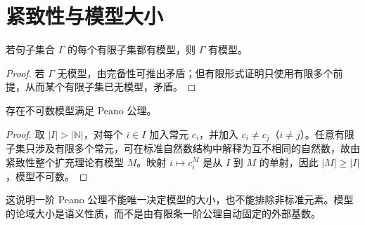 \section{紧致性与模型大小}\label{sec:ls}

\begin{theorem}[紧致性]
若句子集合 $\Gamma$ 的每个有限子集都有模型，则 $\Gamma$ 有模型。
\end{theorem}

\begin{proof}
若 $\Gamma$ 无模型，由完备性可推出矛盾；但有限形式证明只使用有限多个前提，从而某个有限子集已无模型，矛盾。
\end{proof}

\begin{theorem}
存在不可数模型满足 Peano 公理。
\end{theorem}

\begin{proof}
取 $|I|>|\mathbb N|$，对每个 $i\in I$ 加入常元 $c_i$，并加入 $c_i\neq c_j$（$i\neq j$）。任意有限子集只涉及有限多个常元，可在标准自然数结构中解释为互不相同的自然数，故由紧致性整个扩充理论有模型 $M$。映射 $i\mapsto c_i^M$ 是从 $I$ 到 $M$ 的单射，因此 $|M|\ge |I|$，模型不可数。
\end{proof}

这说明一阶 Peano 公理不能唯一决定模型的大小，也不能排除非标准元素。模型的论域大小是语义性质，而不是由有限条一阶公理自动固定的外部基数。
